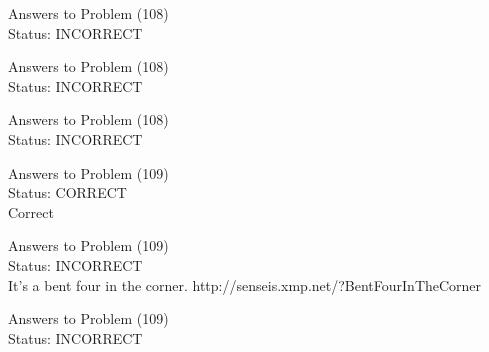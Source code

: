 \documentclass[11pt]{article}
\begin{document}
\begin{minipage}[t]{0.5\textwidth}
  {\centering
  
  Answers to Problem (108)\\
  Status: INCORRECT\\
  
  }
\end{minipage}
\begin{minipage}[t]{0.5\textwidth}
  {\centering
  
  Answers to Problem (108)\\
  Status: INCORRECT\\
  
  }
\end{minipage}
\begin{minipage}[t]{0.5\textwidth}
  {\centering
  
  Answers to Problem (108)\\
  Status: INCORRECT\\
  
  }
\end{minipage}
\begin{minipage}[t]{0.5\textwidth}
  {\centering
  
  Answers to Problem (109)\\
  Status: CORRECT\\
  Correct\\
  }
\end{minipage}
\begin{minipage}[t]{0.5\textwidth}
  {\centering
  
  Answers to Problem (109)\\
  Status: INCORRECT\\
  It's a bent four in the corner. 
http://senseis.xmp.net/?BentFourInTheCorner\\
  }
\end{minipage}
\begin{minipage}[t]{0.5\textwidth}
  {\centering
  
  Answers to Problem (109)\\
  Status: INCORRECT\\
  
  }
\end{minipage}
\end{document}

